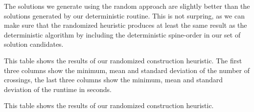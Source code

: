 \documentclass{scrartcl}
\begin{document}
The solutions we generate using the random approach are slightly
better than the solutions generated by our deterministic routine. This
is not surpring, as we can make sure that the randomized heuristic
produces at least the same result as the deterministic algorithm by
including the deterministic spine-order in our set of solution
candidates.


\begin{table}[h]

\centering

\caption{This table shows the results of our randomized construction
  heuristic. The first three columns show the minimum, mean and
  standard deviation of the number of crossings, the last three
  columns show the minimum, mean and standard deviation of the runtime
  in seconds.}
\caption{This table shows the results of our randomized construction heuristic.}

\label{tab:results}
\end{table}
\end{document}
